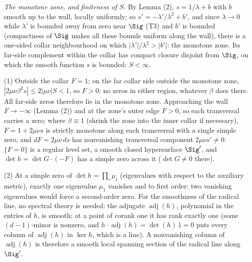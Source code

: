\emph{The monotone zone, and finiteness of $S$.} By Lemma (2), $s = 1/\lambda + b$ with $b$ smooth up to the wall, locally uniformly; so $s' = -\lambda'/\lambda^2 + b'$, and since $\lambda \to 0$ while $\lambda'$ is bounded away from zero near $\Sig$ (T3) and $b'$ is bounded (compactness of $\Sig$ makes all these bounds uniform along the wall), there is a one-sided collar neighbourhood on which $|\lambda'|/\lambda^2 > |b'|$: the monotone zone. Its far-side complement within the collar has compact closure disjoint from $\Sig$, on which the smooth function $s$ is bounded: $S < \infty$.

(1) Outside the collar $F = 1$; on the far collar side outside the monotone zone, $|2\mu\nu\beta^2 s| \leq 2|\mu\nu| S < 1$, so $F > 0$: no zeros in either region, whatever $\beta$ does there. All far-side zeros therefore lie in the monotone zone. Approaching the wall $F \to -\infty$ (Lemma (2)) and at the zone's outer edge $F > 0$, so each transversal carries a zero; where $\beta \equiv 1$ (shrink the zone into the inner collar if necessary), $F = 1 + 2\mu\nu s$ is strictly monotone along each transversal with a single simple zero, and $dF = 2\mu\nu\, ds$ has nonvanishing transversal component $2\mu\nu s' \neq 0$: $\{F = 0\}$ is a regular level set, a smooth closed hypersurface $\Sig'$, and $\det h = \det G \cdot (-F)$ has a simple zero across it ($\det G \neq 0$ there).

(2) At a simple zero of $\det h = \prod_i \mu_i$ (eigenvalues with respect to the auxiliary metric), exactly one eigenvalue $\mu_1$ vanishes and to first order: two vanishing eigenvalues would force a second-order zero. For the smoothness of the radical line, no spectral theory is needed: the adjugate $\operatorname{adj}(h)$, polynomial in the entries of $h$, is smooth; at a point of corank one it has rank exactly one (some $(d{-}1)$-minor is nonzero, and $h \cdot \operatorname{adj}(h) = \det(h)\,1 = 0$ puts every column of $\operatorname{adj}(h)$ in $\ker h$, which is a line). A nonvanishing column of $\operatorname{adj}(h)$ is therefore a smooth local spanning section of the radical line along $\Sig'$.

